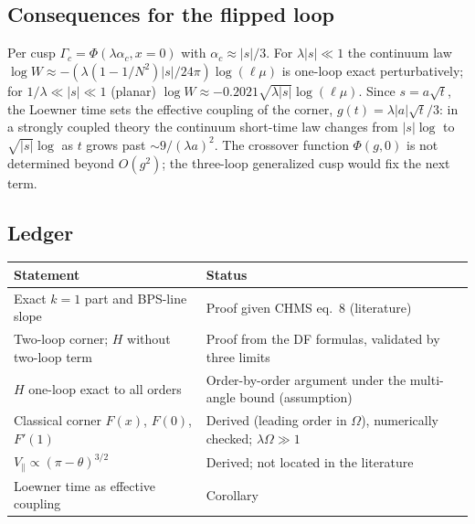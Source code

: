 \subsection{Consequences for the flipped loop}

Per cusp $\Gamma_c=\Phi(\lambda\alpha_c,x=0)$ with $\alpha_c\approx|s|/3$. For $\lambda|s|\ll1$ the continuum law
$\log W\approx-(\lambda(1-1/N^2)|s|/24\pi)\log(\ell\mu)$ is one-loop exact perturbatively; for $1/\lambda\ll|s|\ll1$
(planar) $\log W\approx-0.2021\sqrt{\lambda|s|}\log(\ell\mu)$. Since $s=a\sqrt t$, the Loewner time sets the effective
coupling of the corner, $g(t)=\lambda|a|\sqrt t/3$: in a strongly coupled theory the continuum short-time law changes
from $|s|\log$ to $\sqrt{|s|}\log$ as $t$ grows past $\sim9/(\lambda a)^2$. The crossover function $\Phi(g,0)$ is not
determined beyond $O(g^2)$; the three-loop generalized cusp \cite{CHMSthree} would fix the next term.

\subsection*{Ledger}
\begin{center}\small
\begin{tabular}{@{}p{}p{}@{}}
\toprule
Statement & Status\\
\midrule
Exact $k=1$ part and BPS-line slope & Proof given CHMS eq.~8 (literature)\\
Two-loop corner; $H$ without two-loop term & Proof from the DF formulas, validated by three limits\\
$H$ one-loop exact to all orders & Order-by-order argument under the multi-angle bound (assumption)\\
Classical corner $F(x)$, $F(0)$, $F'(1)$ & Derived (leading order in $\Omega$), numerically checked; $\lambda\Omega\gg1$\\
$V_\parallel\propto(\pi-\theta)^{3/2}$ & Derived; not located in the literature\\
Loewner time as effective coupling & Corollary\\
\bottomrule
\end{tabular}
\end{center}
